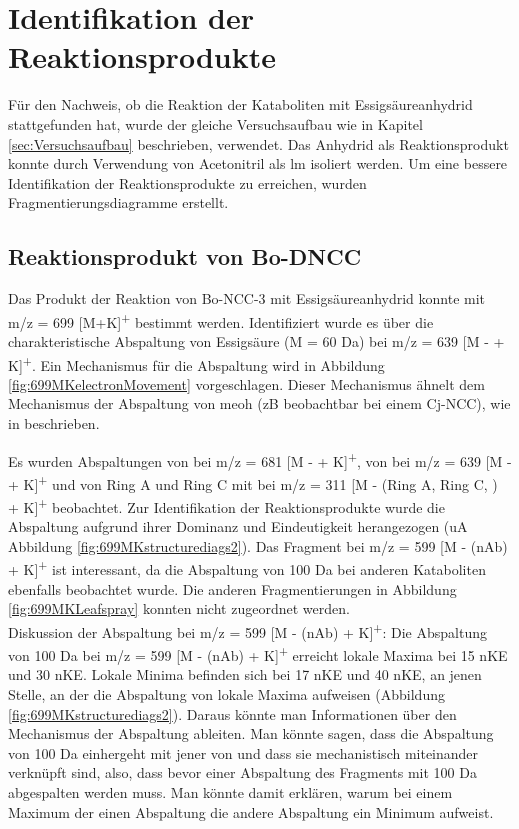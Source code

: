 \section{Identifikation der Reaktionsprodukte}

Für den Nachweis, ob die Reaktion der Kataboliten mit Essigsäureanhydrid stattgefunden hat, wurde der gleiche Versuchsaufbau wie in Kapitel \ref{sec:Versuchsaufbau} beschrieben, verwendet. Das Anhydrid als Reaktionsprodukt konnte durch Verwendung von Acetonitril als \gls{lm} isoliert werden. Um eine bessere Identifikation der Reaktionsprodukte zu erreichen, wurden Fragmentierungsdiagramme erstellt.  



\subsection{Reaktionsprodukt von Bo-DNCC}

Das Produkt der Reaktion von Bo-NCC-3 mit Essigsäureanhydrid konnte mit m/z = 699 [M+K]\textsuperscript{+} bestimmt werden. Identifiziert wurde es über die charakteristische Abspaltung von Essigsäure (M = 60 Da) bei m/z = 639 [M -  + K]\textsuperscript{+}. Ein Mechanismus für die Abspaltung wird in Abbildung \ref{fig:699MKelectronMovement} vorgeschlagen. Dieser Mechanismus ähnelt dem Mechanismus der Abspaltung von \gls{meoh} (\gls{zB} beobachtbar bei einem Cj-NCC), wie in \cite{StructureElucidation} beschrieben.

Es wurden Abspaltungen von  bei m/z = 681 [M -  + K]\textsuperscript{+}, von  bei m/z = 639 [M -  + K]\textsuperscript{+} und von Ring A und Ring C mit  bei m/z = 311 [M - (Ring A, Ring C, ) + K]\textsuperscript{+} beobachtet. Zur Identifikation der Reaktionsprodukte wurde die  Abspaltung aufgrund ihrer Dominanz und Eindeutigkeit herangezogen (\gls{uA} Abbildung \ref{fig:699MKstructurediags2}). Das Fragment bei m/z = 599 [M - (\gls{nAb}) + K]\textsuperscript{+} ist interessant, da die Abspaltung von 100 Da bei anderen Kataboliten ebenfalls beobachtet wurde. Die anderen Fragmentierungen in Abbildung \ref{fig:699MKLeafspray} konnten nicht zugeordnet werden. \\

Diskussion der Abspaltung bei m/z = 599 [M - (\gls{nAb}) + K]\textsuperscript{+}: Die Abspaltung von 100 Da bei m/z = 599 [M - (\gls{nAb}) + K]\textsuperscript{+} erreicht lokale Maxima bei 15 \gls{nKE} und 30 \gls{nKE}. Lokale Minima befinden sich bei 17 \gls{nKE} und 40 \gls{nKE}, an jenen Stelle, an der die Abspaltung von  lokale Maxima aufweisen (Abbildung \ref{fig:699MKstructurediags2}). Daraus könnte man Informationen über den Mechanismus der Abspaltung ableiten. Man könnte sagen, dass die Abspaltung von 100 Da einhergeht mit jener von  und dass sie mechanistisch miteinander verknüpft sind, also, dass bevor einer Abspaltung des Fragments mit 100 Da  abgespalten werden muss. Man könnte damit erklären, warum bei einem Maximum der einen Abspaltung die andere Abspaltung ein Minimum aufweist.\\ 

